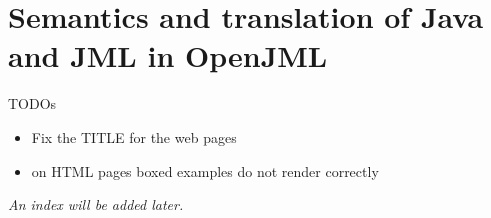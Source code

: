 \documentclass{report}%
\begin{document}






\part{Semantics and translation of Java and JML in OpenJML}
\label{part:semantics}




\pagebreak

TODOs
\begin{itemize}
\item Fix the TITLE for the web pages
\item on HTML pages boxed examples do not render correctly
\end{itemize}

\textit{An index will be added later.} %


\end{document}
